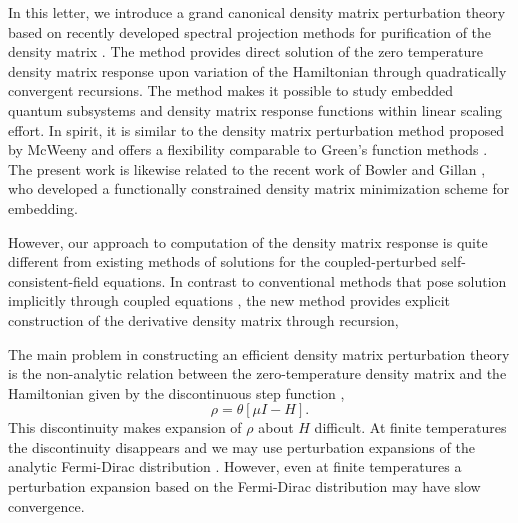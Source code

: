 \documentclass[prl,aps,twocolumn,showpacs,twocolumngrid,superbib]{revtex4}
\begin{document}
In this letter, we introduce a grand canonical density matrix perturbation theory based
on recently developed spectral projection methods for purification of the density matrix
\cite{NiklassonSP2,NiklassonSP4}. The method provides direct solution of the zero temperature 
density matrix response upon variation of the Hamiltonian through quadratically convergent 
recursions. The method makes it possible to study embedded quantum subsystems 
and density matrix response functions within linear scaling effort.
In spirit, it is similar to the density matrix perturbation method
proposed by McWeeny \cite{McWeeny_PRT} and offers a flexibility comparable to
Green's function methods \cite{Inglesfield81,Turek}.
The present work is likewise related to the recent work of Bowler and Gillan \cite{Bowler02},
who developed a functionally constrained density matrix minimization scheme for embedding.

However, our approach to computation of the density matrix response is quite different from 
existing methods of solutions for the coupled-perturbed self-consistent-field equations.  
In contrast to conventional methods that pose solution implicitly through coupled equations 
\cite{Frisch,Dupuis,Ochsenfeld,Larsen}, the new method provides explicit construction of the 
derivative density matrix through recursion,  

The main problem in constructing an efficient
density matrix perturbation theory is the non-analytic
relation between the zero-temperature density matrix and 
the Hamiltonian given by the discontinuous step function \cite{Notation},
\begin{equation} \label{DM}
\rho = \theta[\mu I -  H].
\end{equation}
This discontinuity makes expansion of $\rho$ about $H$ difficult.
At finite temperatures the discontinuity disappears and we may use perturbation 
expansions of the analytic Fermi-Dirac distribution \cite{Feynman}. 
However, even at finite temperatures a perturbation expansion based
on the Fermi-Dirac distribution may have slow convergence.
\end{document}
